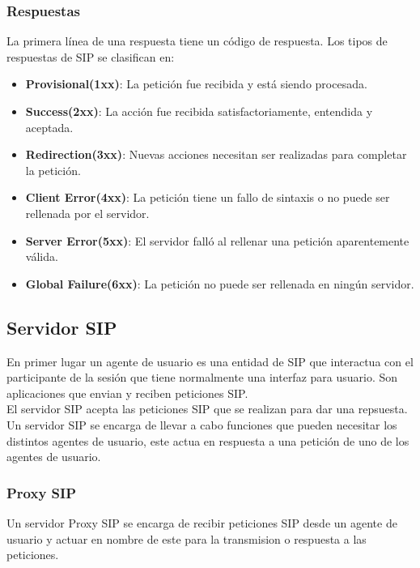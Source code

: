 \documentclass[a4paper, 11pt]{article} %
\begin{document}
		\subsubsection{Respuestas}
		La primera línea de una respuesta tiene un código de respuesta. Los tipos de respuestas de SIP se clasifican en:
		\begin{itemize}
			\item \textbf{Provisional(1xx)}: La petición fue recibida y está siendo  procesada.
			\item \textbf{Success(2xx)}: La acción fue recibida satisfactoriamente, entendida y aceptada.
			\item \textbf{Redirection(3xx)}: Nuevas acciones necesitan ser realizadas para completar la petición.
			\item \textbf{Client Error(4xx)}: La petición tiene un fallo de sintaxis o no puede ser rellenada por el servidor.
			\item \textbf{Server Error(5xx)}: El servidor falló al rellenar una petición aparentemente válida.
			\item \textbf{Global Failure(6xx)}: La petición no puede ser rellenada en ningún servidor.
		\end{itemize}
	
	\subsection{Servidor SIP}
		En primer lugar un agente de usuario es una entidad de SIP que interactua con el participante de la sesión que tiene normalmente una interfaz para usuario. Son aplicaciones que envian y reciben peticiones SIP.\\
		El servidor SIP acepta las peticiones SIP que se realizan para dar una repsuesta. Un servidor SIP se encarga de llevar a cabo funciones que pueden necesitar los distintos agentes de usuario, este actua en respuesta a una petición de uno de los agentes de usuario.
		
		\subsubsection{Proxy SIP}
			Un servidor Proxy SIP se encarga de recibir peticiones SIP desde un agente de usuario y actuar en nombre de este para la transmision o respuesta a las peticiones.
		
\end{document}
